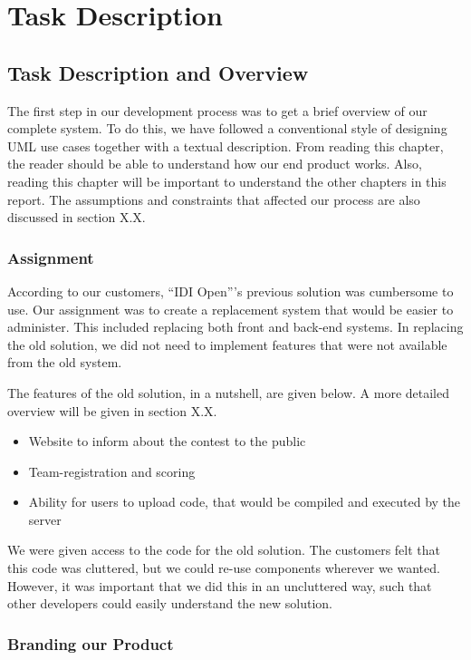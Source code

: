 \chapter{Task Description}

\section{Task Description and Overview}

The first step in our development process was to get a brief overview of
our complete system. To do this, we have followed a conventional style
of designing UML use cases together with a textual description. From
reading this chapter, the reader should be able to understand how our
end product works. Also, reading this chapter will be important to
understand the other chapters in this report. The assumptions and
constraints that affected our process are also discussed in section
X.X. 

\subsection{Assignment}
According to our customers, ``IDI Open'''s previous solution was
cumbersome to use. Our assignment was to create a replacement system
that would be easier to administer.
This included replacing both front and back-end systems. In replacing
the old solution, we did not need to implement features that were not
available from the old system. 

The features of the old solution, in a nutshell, are given below. A more
detailed overview will be given in section X.X.
\begin{itemize}
\item Website to inform about the contest to the public
\item Team-registration and scoring
\item Ability for users to upload code, that would be compiled and executed by the server
\end{itemize}

We were given access to the code for the old solution. The customers
felt that this code was cluttered, but we could re-use components
wherever we wanted. However, it was important that we did this in an
uncluttered way, such that other developers could easily understand the
new solution.

\subsection{Branding our Product}

